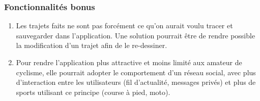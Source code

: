 \subsubsection{Fonctionnalités bonus}
\begin{enumerate}
  \item Les trajets faits ne sont pas forcément ce qu'on aurait voulu tracer et sauvegarder dans l'application. Une solution pourrait être de
  rendre possible la modification d'un trajet afin de le re-dessiner.
  \item Pour rendre l'application plus attractive et moins limité aux amateur de cyclisme, elle pourrait adopter le comportement d'un réseau
  social, avec plus d'interaction entre les utilisateurs (fil d'actualité, messages privés) et plus de sports utilisant ce principe (course à pied, moto).
\end{enumerate}